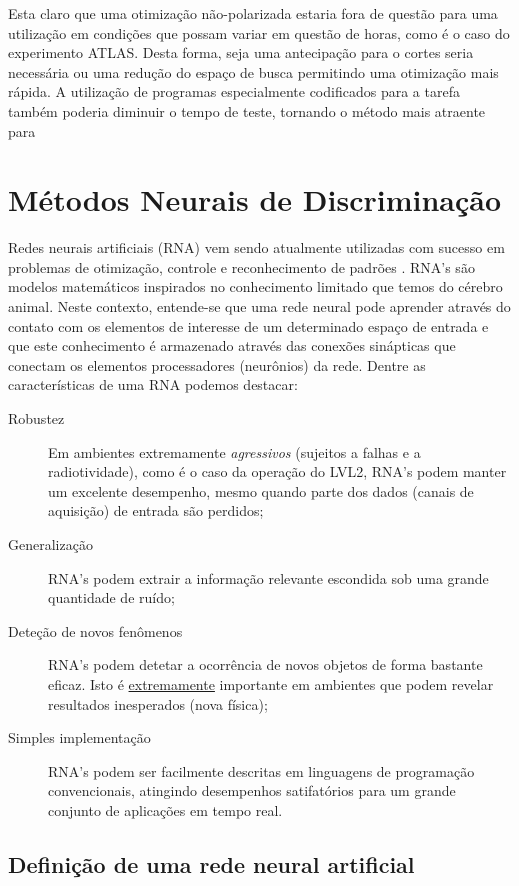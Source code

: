 Esta claro que uma otimização não-polarizada estaria fora de questão para uma
utilização em condições que possam variar em questão de horas, como é o caso do
experimento ATLAS. Desta forma, seja uma antecipação para o cortes seria
necessária ou uma redução do espaço de busca permitindo uma otimização mais
rápida. A utilização de programas especialmente codificados para a tarefa
também poderia diminuir o tempo de teste, tornando o método mais atraente para 

\section{Métodos Neurais de Discriminação}

Redes neurais artificiais (RNA) vem sendo atualmente utilizadas com sucesso em
problemas de otimização, controle e reconhecimento de padrões
\cite{haykin}. RNA's são modelos matemáticos inspirados no
conhecimento limitado que temos do cérebro animal. Neste contexto, entende-se
que uma rede neural pode aprender através do contato com os elementos de
interesse de um determinado espaço de entrada e que este conhecimento é
armazenado através das conexões sinápticas que conectam os elementos
processadores (neurônios) da rede. Dentre as características de uma RNA
podemos destacar:

\begin{description}
\item[Robustez] Em ambientes extremamente \emph{agressivos} (sujeitos a falhas
e a radiotividade), como é o caso da operação do LVL2, RNA's podem manter um
excelente desempenho, mesmo quando parte dos dados (canais de aquisição) de
entrada são perdidos;

\item[Generalização] RNA's podem extrair a informação relevante escondida sob
uma grande quantidade de ruído;

\item[Deteção de novos fenômenos] RNA's podem detetar a ocorrência de novos
objetos de forma bastante eficaz. Isto é \underline{extremamente} importante
em ambientes que podem revelar resultados inesperados (nova física);

\item[Simples implementação] RNA's podem ser facilmente descritas em
linguagens de programação convencionais, atingindo desempenhos satifatórios
para um grande conjunto de aplicações em tempo real.
\end{description}

\subsection{Definição de uma rede neural artificial}

